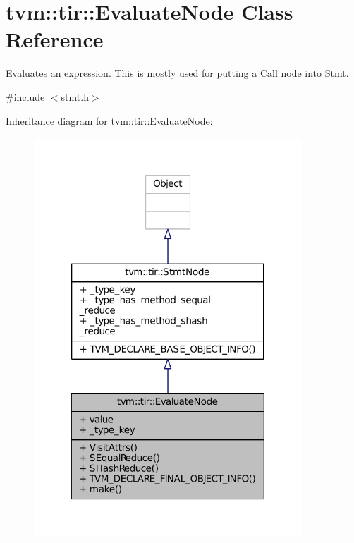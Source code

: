 \hypertarget{classtvm_1_1tir_1_1EvaluateNode}{}\section{tvm\+:\+:tir\+:\+:Evaluate\+Node Class Reference}
\label{classtvm_1_1tir_1_1EvaluateNode}


Evaluates an expression. This is mostly used for putting a Call node into \hyperlink{classtvm_1_1tir_1_1Stmt}{Stmt}.  




{\ttfamily \#include $<$stmt.\+h$>$}



Inheritance diagram for tvm\+:\+:tir\+:\+:Evaluate\+Node\+:
\nopagebreak
\begin{figure}[H]
\begin{center}
\leavevmode
\includegraphics[width=285pt]{classtvm_1_1tir_1_1EvaluateNode__inherit__graph}
\end{center}
\end{figure}


